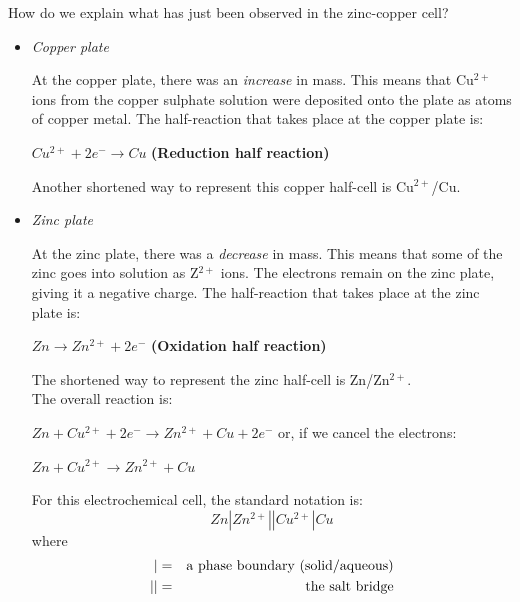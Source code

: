
How do we explain what has just been observed in the zinc-copper cell?

\begin{itemize}
\item{\textit{Copper plate}

At the copper plate, there was an \textit{increase} in mass. This means that Cu$^{2+}$ ions from the copper sulphate solution were deposited onto the plate as atoms of copper metal. The half-reaction that takes place at the copper plate is:
\begin{center}
\rm${Cu^{2+} + 2e^{-} \rightarrow Cu}$ \textbf{(Reduction half reaction)}
\end{center}

Another shortened way to represent this copper half-cell is Cu$^{2+}$/Cu.
}

\item{\textit{Zinc plate}

At the zinc plate, there was a \textit{decrease} in mass. This means that some of the zinc goes into solution as Z$^{2+}$ ions. The electrons remain on the zinc plate, giving it a negative charge. The half-reaction that takes place at the zinc plate is:
\begin{center}
\rm${Zn \rightarrow Zn^{2+} + 2e^{-}}$ \textbf{(Oxidation half reaction)}
\end{center}

The shortened way to represent the zinc half-cell is Zn/Zn$^{2+}$.\\

The overall reaction is:

\begin{center}
\rm${Zn + Cu^{2+} + 2e^{-} \rightarrow Zn^{2+} + Cu + 2e^{-}}$ or, if we cancel the electrons:

\rm${Zn + Cu^{2+} \rightarrow Zn^{2+} + Cu}$ 
\end{center}

For this electrochemical cell, the standard notation is:
\begin{equation*}
Zn|Zn^{2+}||Cu^{2+}|Cu
\end{equation*}
where
\begin{eqnarray*}
  | &=& \rm{a \ phase \ boundary \ (solid/aqueous)}\\
  || & = & \rm{the \ salt \ bridge}
\end{eqnarray*}
}  
\end{itemize}

